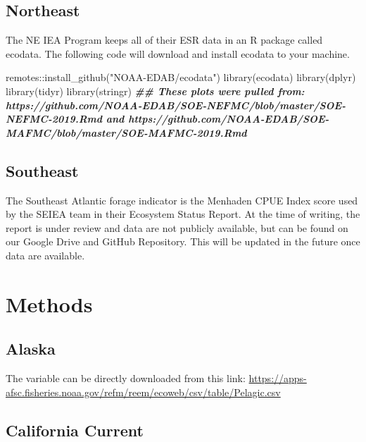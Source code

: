 \documentclass[
]{book}
\newenvironment{Shaded}{\begin{snugshade}}{\end{snugshade}}
\newcommand{\DocumentationTok}[1]{\textcolor[rgb]{0.56,0.35,0.01}{\textbf{\textit{#1}}}}
\newcommand{\FunctionTok}[1]{\textcolor[rgb]{0.00,0.00,0.00}{#1}}
\newcommand{\NormalTok}[1]{#1}
\newcommand{\SpecialCharTok}[1]{\textcolor[rgb]{0.00,0.00,0.00}{#1}}
\newcommand{\StringTok}[1]{\textcolor[rgb]{0.31,0.60,0.02}{#1}}
\begin{document}
\hypertarget{northeast}{%
\subsection{Northeast}\label{northeast}}

The NE IEA Program keeps all of their ESR data in an R package called ecodata. The following code will download and install ecodata to your machine.

\begin{Shaded}
\begin{Highlighting}[]
\NormalTok{remotes}\SpecialCharTok{::}\FunctionTok{install\_github}\NormalTok{(}\StringTok{"NOAA{-}EDAB/ecodata"}\NormalTok{)}
\FunctionTok{library}\NormalTok{(ecodata)}
\FunctionTok{library}\NormalTok{(dplyr)}
\FunctionTok{library}\NormalTok{(tidyr)}
\FunctionTok{library}\NormalTok{(stringr)}
\DocumentationTok{\#\# These plots were pulled from: https://github.com/NOAA{-}EDAB/SOE{-}NEFMC/blob/master/SOE{-}NEFMC{-}2019.Rmd and https://github.com/NOAA{-}EDAB/SOE{-}MAFMC/blob/master/SOE{-}MAFMC{-}2019.Rmd}
\end{Highlighting}
\end{Shaded}

\hypertarget{southeast}{%
\subsection{Southeast}\label{southeast}}

The Southeast Atlantic forage indicator is the Menhaden CPUE Index score used by the SEIEA team in their Ecosystem Status Report. At the time of writing, the report is under review and data are not publicly available, but can be found on our Google Drive and GitHub Repository. This will be updated in the future once data are available.

\hypertarget{methods-2}{%
\section{Methods}\label{methods-2}}

\hypertarget{alaska-1}{%
\subsection{Alaska}\label{alaska-1}}

The variable can be directly downloaded from this link: \url{https://apps-afsc.fisheries.noaa.gov/refm/reem/ecoweb/csv/table/Pelagic.csv}

\hypertarget{california-current-1}{%
\subsection{California Current}\label{california-current-1}}
\end{document}
